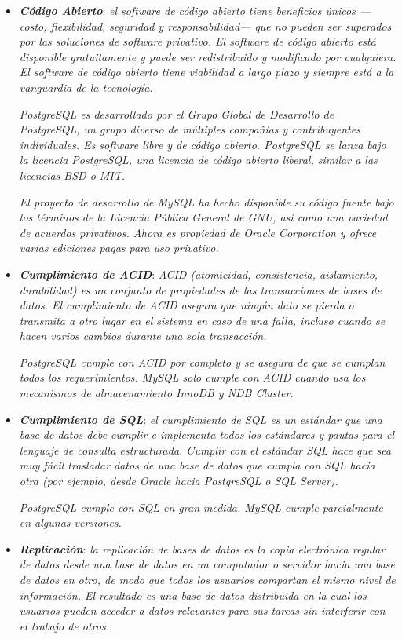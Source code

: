 \documentclass[11pt,oneside]{book}
\begin{document}
\begin{itemize}
\item \textit{\textbf{Código Abierto}}: \textit{el software de código abierto tiene beneficios únicos —costo, flexibilidad, seguridad y responsabilidad— que no pueden ser superados por las soluciones de software privativo. El software de código abierto está disponible gratuitamente y puede ser redistribuido y modificado por cualquiera. El software de código abierto tiene viabilidad a largo plazo y siempre está a la vanguardia de la tecnología.}

\textit{PostgreSQL es desarrollado por el Grupo Global de Desarrollo de PostgreSQL, un grupo diverso de múltiples compañías y contribuyentes individuales. Es software libre y de código abierto. PostgreSQL se lanza bajo la licencia PostgreSQL, una licencia de código abierto liberal, similar a las licencias BSD o MIT.}

\textit{El proyecto de desarrollo de MySQL ha hecho disponible su código fuente bajo los términos de la Licencia Pública General de GNU, así como una variedad de acuerdos privativos. Ahora es propiedad de Oracle Corporation y ofrece varias ediciones pagas para uso privativo.}

\item \textit{\textbf{Cumplimiento de ACID}}: \textit{ACID (atomicidad, consistencia, aislamiento, durabilidad) es un conjunto de propiedades de las transacciones de bases de datos. El cumplimiento de ACID asegura que ningún dato se pierda o transmita a otro lugar en el sistema en caso de una falla, incluso cuando se hacen varios cambios durante una sola transacción.}

\textit{PostgreSQL cumple con ACID por completo y se asegura de que se cumplan todos los requerimientos. MySQL solo cumple con ACID cuando usa los mecanismos de almacenamiento InnoDB y NDB Cluster.}

\item \textit{\textbf{Cumplimiento de SQL}}: \textit{el cumplimiento de SQL es un estándar que una base de datos debe cumplir e implementa todos los estándares y pautas para el lenguaje de consulta estructurada. Cumplir con el estándar SQL hace que sea muy fácil trasladar datos de una base de datos que cumpla con SQL hacia otra (por ejemplo, desde Oracle hacia PostgreSQL o SQL Server).}

\textit{PostgreSQL cumple con SQL en gran medida. MySQL cumple parcialmente en algunas versiones.}

\item \textit{\textbf{Replicación}}: \textit{la replicación de bases de datos es la copia electrónica regular de datos desde una base de datos en un computador o servidor hacia una base de datos en otro, de modo que todos los usuarios compartan el mismo nivel de información. El resultado es una base de datos distribuida en la cual los usuarios pueden acceder a datos relevantes para sus tareas sin interferir con el trabajo de otros.}


\end{itemize}
\end{document}
